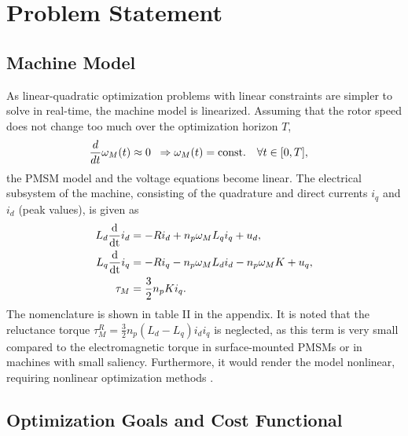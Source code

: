 \documentclass[a4paper,11pt,fleqn]{article}
\newcommand{\ddt}{\frac{\textnormal{d}}{\textnormal{dt}}}
\begin{document}
\section*{Problem Statement}


\subsection*{Machine Model}

As linear-quadratic optimization problems with linear constraints are simpler to solve in real-time, the machine model is linearized. Assuming that the rotor speed does not change too much over the optimization horizon $T$,
\begin{align}
\frac{d}{dt} \omega_M(t) &\approx 0  \;\; \Rightarrow \omega_M(t) = \textnormal{const. } \;\; \forall t\in[0,T] ,
\end{align}
the PMSM model and the voltage equations become linear. The electrical subsystem of the machine, consisting of the quadrature and direct currents $i_q$ and $i_d$ (peak values), is given as
\begin{align}
L_d \ddt i_d &=  -R i_d  + n_p \omega_M L_q i_q  + u_d   ,                 \label{eq:id} \\
L_q \ddt i_q &=  -R i_q  - n_p \omega_M L_d i_d  -n_p \omega_M K  + u_q  , \label{eq:iq} \\
      \tau_M &=   \frac{3}{2} n_p K i_q .
\end{align}
The nomenclature is shown in table II in the appendix. It is noted that the reluctance torque $\tau_M^R = \frac{3}{2} n_p (L_d-L_q)i_di_q$ is neglected, as this term is very small compared to the electromagnetic torque in surface-mounted PMSMs or in machines with small saliency. Furthermore, it would render the model nonlinear, requiring nonlinear optimization methods \cite{Delaleau}.




\subsection*{Optimization Goals and Cost Functional}
\end{document}
